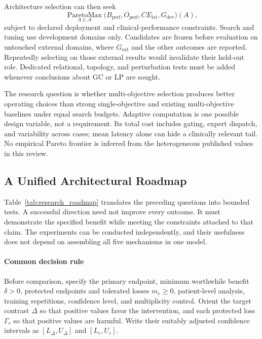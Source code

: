 \documentclass[5p,times,authoryear]{elsarticle}
\begin{document}
Architecture selection can then seek
\begin{equation}
\underset{A\in\mathcal A}{\operatorname{ParetoMax}}
\bigl(B_{\mathrm{perf}},O_{\mathrm{perf}},CE_{\mathrm{lat}},G_{\mathrm{dev}}\bigr)(A),
\end{equation}
subject to declared deployment and clinical-performance constraints. Search and tuning use development domains only. Candidates are frozen before evaluation on untouched external domains, where $G_{\mathrm{ext}}$ and the other outcomes are reported. Repeatedly selecting on those external results would invalidate their held-out role. Dedicated relational, topology, and perturbation tests must be added whenever conclusions about GC or LP are sought.

The research question is whether multi-objective selection produces better operating choices than strong single-objective and existing multi-objective baselines under equal search budgets. Adaptive computation is one possible design variable, not a requirement. Its total cost includes gating, expert dispatch, and variability across cases; mean latency alone can hide a clinically relevant tail. No empirical Pareto frontier is inferred from the heterogeneous published values in this review.

\subsection{A Unified Architectural Roadmap}
\label{subsec:roadmap}

Table~\ref{tab:research_roadmap} translates the preceding questions into bounded tests. A successful direction need not improve every outcome. It must demonstrate the specified benefit while meeting the constraints attached to that claim. The experiments can be conducted independently, and their usefulness does not depend on assembling all five mechanisms in one model.


\paragraph{Common decision rule}
Before comparison, specify the primary endpoint, minimum worthwhile benefit $\delta>0$, protected endpoints and tolerated losses $m_r\geq0$, patient-level analysis, training repetitions, confidence level, and multiplicity control. Orient the target contrast $\Delta$ so that positive values favor the intervention, and each protected loss $\Gamma_r$ so that positive values are harmful. Write their suitably adjusted confidence intervals as $[L_\Delta,U_\Delta]$ and $[L_r,U_r]$.
\end{document}
